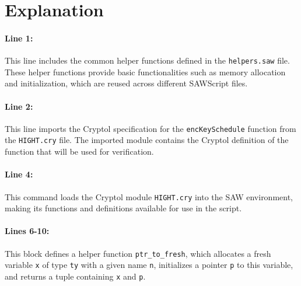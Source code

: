 \documentclass{article}
\begin{document}
    
    
    \section*{Explanation}
    
    \paragraph{Line 1:} 
    This line includes the common helper functions defined in the \texttt{helpers.saw} file. These helper functions provide basic functionalities such as memory allocation and initialization, which are reused across different SAWScript files.
    
    \paragraph{Line 2:} 
    This line imports the Cryptol specification for the \texttt{encKeySchedule} function from the \texttt{HIGHT.cry} file. The imported module contains the Cryptol definition of the function that will be used for verification.
    
    \paragraph{Line 4:} 
    This command loads the Cryptol module \texttt{HIGHT.cry} into the SAW environment, making its functions and definitions available for use in the script.
    
    \paragraph{Lines 6-10:} 
    This block defines a helper function \texttt{ptr\_to\_fresh}, which allocates a fresh variable \texttt{x} of type \texttt{ty} with a given name \texttt{n}, initializes a pointer \texttt{p} to this variable, and returns a tuple containing \texttt{x} and \texttt{p}.
    
\end{document}
